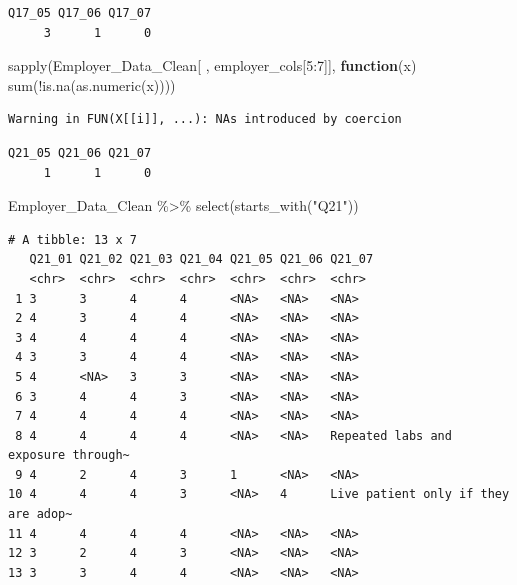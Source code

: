 \documentclass[
  11pt,
  letterpaper,
  DIV=11,
  numbers=noendperiod]{scrartcl}
\newenvironment{Shaded}{\begin{snugshade}}{\end{snugshade}}
\newcommand{\ControlFlowTok}[1]{\textcolor[rgb]{0.00,0.23,0.31}{\textbf{#1}}}
\newcommand{\DecValTok}[1]{\textcolor[rgb]{0.68,0.00,0.00}{#1}}
\newcommand{\FunctionTok}[1]{\textcolor[rgb]{0.28,0.35,0.67}{#1}}
\newcommand{\NormalTok}[1]{\textcolor[rgb]{0.00,0.23,0.31}{#1}}
\newcommand{\SpecialCharTok}[1]{\textcolor[rgb]{0.37,0.37,0.37}{#1}}
\newcommand{\StringTok}[1]{\textcolor[rgb]{0.13,0.47,0.30}{#1}}
\begin{document}
\begin{verbatim}
Q17_05 Q17_06 Q17_07 
     3      1      0 
\end{verbatim}

\begin{Shaded}
\begin{Highlighting}[]
\FunctionTok{sapply}\NormalTok{(Employer\_Data\_Clean[ , employer\_cols[}\DecValTok{5}\SpecialCharTok{:}\DecValTok{7}\NormalTok{]], }\ControlFlowTok{function}\NormalTok{(x) }\FunctionTok{sum}\NormalTok{(}\SpecialCharTok{!}\FunctionTok{is.na}\NormalTok{(}\FunctionTok{as.numeric}\NormalTok{(x))))}
\end{Highlighting}
\end{Shaded}

\begin{verbatim}
Warning in FUN(X[[i]], ...): NAs introduced by coercion
\end{verbatim}

\begin{verbatim}
Q21_05 Q21_06 Q21_07 
     1      1      0 
\end{verbatim}

\begin{Shaded}
\begin{Highlighting}[]
\NormalTok{Employer\_Data\_Clean }\SpecialCharTok{\%\textgreater{}\%} \FunctionTok{select}\NormalTok{(}\FunctionTok{starts\_with}\NormalTok{(}\StringTok{"Q21"}\NormalTok{))}
\end{Highlighting}
\end{Shaded}

\begin{verbatim}
# A tibble: 13 x 7
   Q21_01 Q21_02 Q21_03 Q21_04 Q21_05 Q21_06 Q21_07                             
   <chr>  <chr>  <chr>  <chr>  <chr>  <chr>  <chr>                              
 1 3      3      4      4      <NA>   <NA>   <NA>                               
 2 4      3      4      4      <NA>   <NA>   <NA>                               
 3 4      4      4      4      <NA>   <NA>   <NA>                               
 4 3      3      4      4      <NA>   <NA>   <NA>                               
 5 4      <NA>   3      3      <NA>   <NA>   <NA>                               
 6 3      4      4      3      <NA>   <NA>   <NA>                               
 7 4      4      4      4      <NA>   <NA>   <NA>                               
 8 4      4      4      4      <NA>   <NA>   Repeated labs and exposure through~
 9 4      2      4      3      1      <NA>   <NA>                               
10 4      4      4      3      <NA>   4      Live patient only if they are adop~
11 4      4      4      4      <NA>   <NA>   <NA>                               
12 3      2      4      3      <NA>   <NA>   <NA>                               
13 3      3      4      4      <NA>   <NA>   <NA>                               
\end{verbatim}
\end{document}
